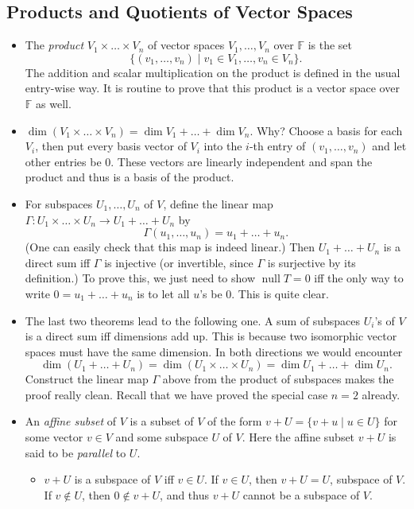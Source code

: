 \documentclass{article}
\newcommand{\F}{\mathbb{F}}
\newcommand{\n}{\operatorname{null}}
\renewcommand{\d}{\dim}
\begin{document}
\subsection{Products and Quotients of Vector Spaces}
\begin{itemize}
    \item The \textit{product} $V_1 \times \dots \times V_n$ of vector spaces $V_1,\dots,V_n$ over $\F$ is the set $$\{(v_1,\dots,v_n) \mid v_1 \in V_1,\dots, v_n \in V_n\}.$$ The addition and scalar multiplication on the product is defined in the usual entry-wise way. It is routine to prove that this product is a vector space over $\F$ as well.
    \item $\d (V_1\times \dots \times V_n) = \d V_1 + \dots + \d V_n$. Why? Choose a basis for each $V_i$, then put every basis vector of $V_i$ into the $i$-th entry of $(v_1,\dots,v_n)$ and let other entries be 0. These vectors are linearly independent and span the product and thus is a basis of the product.
    \item For subspaces $U_1,\dots,U_n$ of $V$, define the linear map $\Gamma: U_1 \times \dots \times U_n \to U_1 + \dots + U_n$ by $$\Gamma(u_1,\dots,u_n) = u_1+\dots+u_n.$$ (One can easily check that this map is indeed linear.) Then $U_1+\dots+U_n$ is a direct sum iff $\Gamma$ is injective (or invertible, since $\Gamma$ is surjective by its definition.) To prove this, we just need to show $\n T = {0}$ iff the only way to write $0 = u_1+\dots+u_n$ is to let all $u$'s be 0. This is quite clear.
    \item The last two theorems lead to the following one. A sum of subspaces $U_i$'s of $V$ is a direct sum iff dimensions add up. This is because two isomorphic vector spaces must have the same dimension. In both directions we would encounter $$\d (U_1+\dots+U_n) = \d (U_1 \times \dots \times U_n) = \d U_1 + \dots + \d U_n.$$
    Construct the linear map $\Gamma$ above from the product of subspaces makes the proof really clean. Recall that we have proved the special case $n=2$ already.
    \item An \textit{affine subset} of $V$ is a subset of $V$ of the form $v+U = \{v+u \mid u \in U\}$ for some vector $v \in V$ and some subspace $U$ of $V$. Here the affine subset $v+U$ is said to be \textit{parallel} to $U$.
    \begin{itemize}
        \item $v+U$ is a subspace of $V$ iff $v \in U$. If $v \in U$, then $v+U = U$, subspace of $V$. If $v \notin U$, then $0 \notin v+U$, and thus $v+U$ cannot be a subspace of $V$.

\end{itemize}
\end{itemize}
\end{document}
